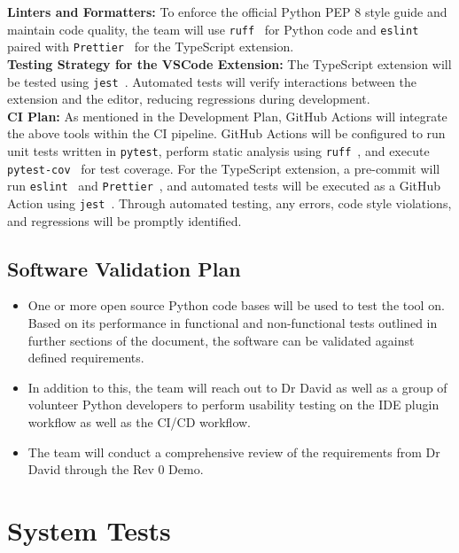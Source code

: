 \documentclass[12pt, titlepage]{article}
\begin{document}
\noindent\textbf{Linters and Formatters:} To enforce the official Python PEP 8 style guide and maintain code quality, the team will use \texttt{ruff}~\cite{ruff} for Python code and \texttt{eslint}~\cite{eslint} paired with \texttt{Prettier}~\cite{prettier} for the TypeScript extension.\\
  
\noindent\textbf{Testing Strategy for the VSCode Extension:} The TypeScript extension will be tested using \texttt{jest}~\cite{jest}. Automated tests will verify interactions between the extension and the editor, reducing regressions during development.\\
  
\noindent\textbf{CI Plan:} As mentioned in the Development Plan, GitHub Actions will integrate the above tools within the CI pipeline. GitHub Actions will be configured to run unit tests written in \texttt{pytest}, perform static analysis using \texttt{ruff}~\cite{ruff}, and execute \texttt{pytest-cov}~\cite{pytest-cov} for test coverage. For the TypeScript extension, a pre-commit will run \texttt{eslint}~\cite{eslint} and \texttt{Prettier}~\cite{prettier}, and automated tests will be executed as a GitHub Action using \texttt{jest}~\cite{jest}. Through automated testing, any errors, code style violations, and regressions will be promptly identified.\\

\subsection{Software Validation Plan}

\begin{itemize}
    \item One or more open source Python code bases will be used to test the tool on. Based on its performance in functional and non-functional tests outlined in further sections of the document, the software can be validated against defined requirements.
    \item In addition to this, the team will reach out to Dr David as well as a group of volunteer Python developers to perform usability testing on the IDE plugin workflow as well as the CI/CD workflow.
    \item The team will conduct a comprehensive review of the requirements from Dr David through the Rev 0 Demo.
\end{itemize}

\section{System Tests}
\end{document}
